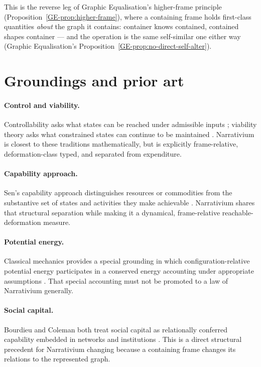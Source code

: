 \documentclass[11pt,a4paper]{article}
\theoremstyle{remark}
\begin{document}
This is the reverse leg of Graphic Equalisation's higher-frame principle (Proposition~\ref{GE-prop:higher-frame}), where a containing frame holds first-class quantities \emph{about} the graph it contains: container knows contained, contained shapes container --- and the operation is the same self-similar one either way (Graphic Equalisation's Proposition~\ref{GE-prop:no-direct-self-alter}).

\section{Groundings and prior art}\label{sec:groundings}

\paragraph{Control and viability.}
Controllability asks what states can be reached under admissible inputs \citep{kalman1960control}; viability theory asks what constrained states can continue to be maintained \citep{aubin1990survey,aubin1991viability}. Narrativium is closest to these traditions mathematically, but is explicitly frame-relative, deformation-class typed, and separated from expenditure.

\paragraph{Capability approach.}
Sen's capability approach distinguishes resources or commodities from the substantive set of states and activities they make achievable \citep{sen1985commodities}. Narrativium shares that structural separation while making it a dynamical, frame-relative reachable-deformation measure.

\paragraph{Potential energy.}
Classical mechanics provides a special grounding in which configuration-relative potential energy participates in a conserved energy accounting under appropriate assumptions \citep{goldstein2002mechanics}. That special accounting must not be promoted to a law of Narrativium generally.

\paragraph{Social capital.}
Bourdieu and Coleman both treat social capital as relationally conferred capability embedded in networks and institutions \citep{bourdieu1986forms,coleman1988social}. This is a direct structural precedent for Narrativium changing because a containing frame changes its relations to the represented graph.
\end{document}
